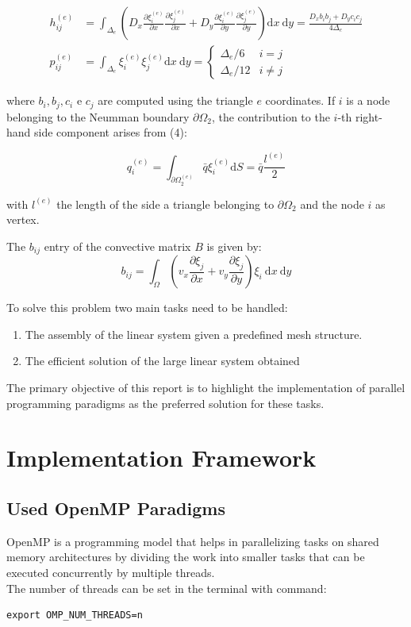 \documentclass{article}
\begin{document}
$$
\begin{aligned}
h_{i j}^{(e)} & =\int_{\Delta_{e}}\left(D_{x} \frac{\partial \xi_{i}^{(e)}}{\partial x} \frac{\partial \xi_{j}^{(e)}}{\partial x}+D_{y} \frac{\partial \xi_{i}^{(e)}}{\partial y} \frac{\partial \xi_{j}^{(e)}}{\partial y}\right) \mathrm{d} x \mathrm{~d} y=\frac{D_{x} b_{i} b_{j}+D_{y} c_{i} c_{j}}{4 \Delta_{e}} \\
p_{i j}^{(e)} & =\int_{\Delta_{e}} \xi_{i}^{(e)} \xi_{j}^{(e)} \mathrm{d} x \mathrm{~d} y= \begin{cases}\Delta_{e} / 6 & i=j \\
\Delta_{e} / 12 & i \neq j\end{cases}
\end{aligned}
$$

where $b_{i}, b_{j}, c_{i}$ e $c_{j}$ are computed using the triangle $e$ coordinates. If $i$ is a node belonging to the Neumman boundary $\partial \Omega_{2}$, the contribution to the $i$-th right-hand side component arises from (4):

$$
q_{i}^{(e)}=\int_{\partial \Omega_{2}^{(e)}} \bar{q} \xi_{i}^{(e)} \mathrm{d} S=\bar{q} \frac{l^{(e)}}{2}
$$

with $l^{(e)}$ the length of the side a triangle belonging to $\partial \Omega_{2}$ and the node $i$ as vertex.

The $b_{i j}$ entry of the convective matrix $B$ is given by:
$$
b_{i j}=\int_{\Omega}\left(v_{x} \frac{\partial \xi_{j}}{\partial x}+v_{y} \frac{\partial \xi_{j}}{\partial y}\right) \xi_{i} \mathrm{~d} x \mathrm{~d} y
$$



\newpage

To solve this problem two main tasks need to be handled:
\begin{enumerate}
    \item The assembly of the linear system given a predefined mesh structure.
    \item The efficient solution of the large linear system obtained
\end{enumerate}
The primary objective of this report is to highlight the implementation of parallel programming paradigms as the preferred solution for these tasks.


\section{Implementation Framework}
\subsection{Used OpenMP Paradigms}
OpenMP is a programming model that helps in parallelizing tasks on shared memory architectures by dividing the work into smaller tasks that can be executed concurrently by multiple threads.\\
The number of threads can be set in the terminal with command:
\begin{verbatim}
export OMP_NUM_THREADS=n
\end{verbatim}
\end{document}

